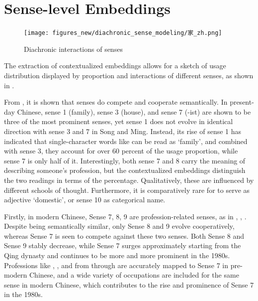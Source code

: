 \section{Sense-level Embeddings}

\begin{figure}[H]
  \centering
  \texttt{[image: figures\_new/diachronic\_sense\_modeling/家\_zh.png]}
  \caption{Diachronic interactions of senses}
  \label{fig:jia_polynomial}
\end{figure}

The extraction of contextualized embeddings allows for a sketch of usage distribution displayed by proportion and interactions of different senses, as shown in .

From , it is shown that senses do compete and cooperate semantically. In present-day Chinese, sense 1 (family), sense 3 (house), and sense 7 (-ist) are shown to be three of the most prominent senses, yet sense 1 does not evolve in identical direction with sense 3 and 7 in Song and Ming. Instead, its rise of sense 1 has indicated that single-character words like \jia can be read as `family', and combined with sense 3, they account for over 60 percent of the usage proportion, while sense 7 is only half of it. Interestingly, both sense 7 and 8 carry the meaning of describing someone's profession, but the contextualized embeddings distinguish the two readings in terms of the percentage. Qualitatively, these are influenced by different schools of thought. Furthermore, it is comparatively rare for \jia to serve as adjective `domestic', or sense 10 as categorical name.

\begin{exe}
\end{exe}

Firstly, in modern Chinese, Sense 7, 8, 9 are profession-related senses, as in , , . Despite being semantically similar, only Sense 8 and 9 evolve cooperatively, whereas Sense 7 is seen to compete against these two senses. Both Sense 8 and Sense 9 stably decrease, while Sense 7 surges approximately starting from the Qing dynasty and continues to be more and more prominent in the 1980s. Professions like , , and  from  through  are accurately mapped to Sense 7 in pre-modern Chinese, and a wide variety of occupations are included for the same sense in modern Chinese, which contributes to the rise and prominence of Sense 7 in the 1980s.

